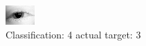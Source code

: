 \begin{figure}[h!]
\begin{center}
\includegraphics[width=0.60\columnwidth]{figures/ID30_class_4_target_3.png}
\end{center}
\caption{ Classification: 4 actual target: 3}
\label{fig:ID30_class_4_target_3}
\end{figure}
